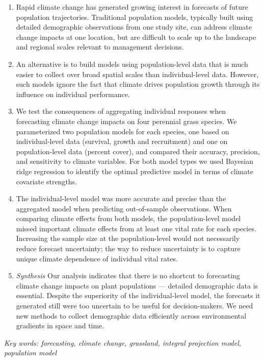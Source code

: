 \documentclass[12pt,]{article}
\begin{document}
\begin{enumerate}
\def\labelenumi{\arabic{enumi}.}
\itemsep1pt\parskip0pt
\item
  Rapid climate change has generated growing interest in forecasts of
  future population trajectories. Traditional population models,
  typically built using detailed demographic observations from one study
  site, can address climate change impacts at one location, but are
  difficult to scale up to the landscape and regional scales relevant to
  management decisions.
\item
  An alternative is to build models using population-level data that is
  much easier to collect over broad spatial scales than individual-level
  data. However, such models ignore the fact that climate drives
  population growth through its influence on individual performance.
\item
  We test the consequences of aggregating individual responses when
  forecasting climate change impacts on four perennial grass species. We
  parameterized two population models for each species, one based on
  individual-level data (survival, growth and recruitment) and one on
  population-level data (percent cover), and compared their accuracy,
  precision, and sensitivity to climate variables. For both model types
  we used Bayesian ridge regression to identify the optimal predictive
  model in terms of climate covariate strengths.
\item
  The individual-level model was more accurate and precise than the
  aggregated model when predicting out-of-sample observations. When
  comparing climate effects from both models, the population-level model
  missed important climate effects from at least one vital rate for each
  species. Increasing the sample size at the population-level would not
  necessarily reduce forecast uncertainty; the way to reduce uncertainty
  is to capture unique climate dependence of individual vital rates.
\item
  \emph{Synthesis} Our analysis indicates that there is no shortcut to
  forecasting climate change impacts on plant populations --- detailed
  demographic data is essential. Despite the superiority of the
  individual-level model, the forecasts it generated still were too
  uncertain to be useful for decision-makers. We need new methods to
  collect demographic data efficiently across environmental gradients in
  space and time.
\end{enumerate}

\emph{Key words: forecasting, climate change, grassland, integral
projection model, population model}
\end{document}
